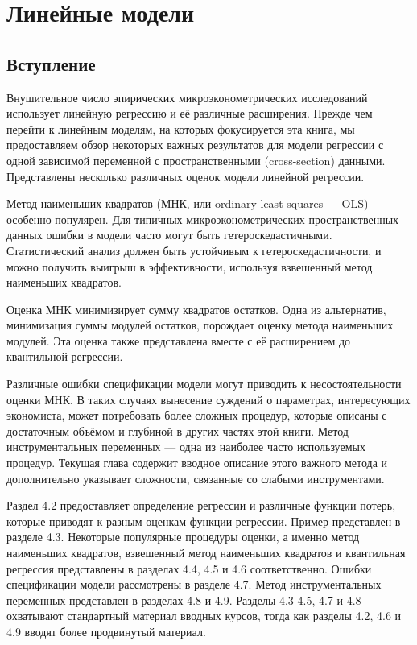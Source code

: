 

\chapter{Линейные модели}

\section{Вступление}

Внушительное число эпирических микроэконометрических исследований использует линейную регрессию и её различные расширения. Прежде чем перейти к линейным моделям, на которых фокусируется эта книга, мы предоставляем обзор некоторых важных результатов для модели регрессии с одной зависимой переменной с пространственными (cross-section) данными. Представлены несколько различных оценок модели линейной регрессии.

Метод наименьших квадратов (МНК, или ordinary least squares --- OLS) особенно популярен. Для типичных микроэконометрических пространственных данных ошибки в модели часто могут быть гетероскедастичными. Статистический анализ должен быть устойчивым к гетероскедастичности, и можно получить выигрыш в эффективности, используя взвешенный метод наименьших квадратов.

Оценка МНК минимизирует сумму квадратов остатков. Одна из альтернатив, минимизация суммы модулей остатков, порождает оценку метода наименьших модулей. Эта оценка также представлена вместе с её расширением до квантильной регрессии.

Различные ошибки спецификации модели могут приводить к несостоятельности оценки МНК. В таких случаях вынесение суждений о параметрах, интересующих экономиста, может потребовать более сложных процедур, которые описаны с достаточным объёмом и глубиной в других частях этой книги. Метод инструментальных переменных --- одна из наиболее часто используемых процедур. Текущая глава содержит вводное описание этого важного метода и дополнительно указывает сложности, связанные со слабыми инструментами.

Раздел 4.2 предоставляет определение регрессии и различные функции потерь, которые приводят к разным оценкам функции регрессии. Пример представлен в разделе 4.3. Некоторые популярные процедуры оценки, а именно метод наименьших квадратов, взвешенный метод наименьших квадратов и квантильная регрессия представлены в разделах 4.4, 4.5 и 4.6 соответственно. Ошибки спецификации модели рассмотрены в разделе 4.7. Метод	инструментальных переменных представлен в разделах 4.8 и 4.9. Разделы 4.3-4.5, 4.7 и 4.8 охватывают стандартный материал вводных курсов, тогда как разделы 4.2, 4.6 и 4.9 вводят более продвинутый материал.

